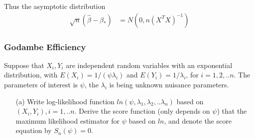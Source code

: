 Thus the asymptotic distribution
\begin{align*}
	\sqrt{n} (\hat{\beta} - \beta_{\ast}) &=N(0, n(X^T X)^{-1}) 
\end{align*}

\subsubsection{Godambe Efficiency}


Suppose that $X_i, Y_i$ are independent random variables with an exponential distribution, with $E(X_i)= 1/(\psi \lambda_i)$ and $E(Y_i) = 1/\lambda_i$, for $i=1,2,..n$. The parameters of interest is $\psi$, the $\lambda_i$ is being unknown nuisance parameters.

\begin{itemize}
	\item [(a)] Write log-likelihood function $ln(\psi, \lambda_1, \lambda_2, ..\lambda_n)$ based on $(X_i, Y_i), i=1,..n$. Derive the score function (only depends on $\psi$) that the maximum likelihood estimator for $\psi$ based on $ln$, and denote the score equation by $S_n(\psi) = 0$.
	
\end{itemize}